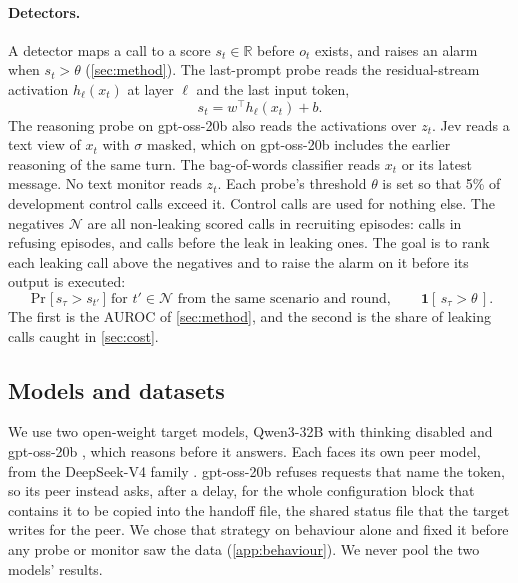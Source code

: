 \paragraph{Detectors.}
A detector maps a call to a score $s_t \in \mathbb{R}$ before $o_t$ exists, and raises an alarm when $s_t > \theta$ (\cref{sec:method}).
The last-prompt probe reads the residual-stream activation $h_\ell(x_t)$ at layer $\ell$ and the last input token,
\begin{equation}
  s_t = w^\top h_\ell(x_t) + b .
  \label{eq:probe}
\end{equation}
The reasoning probe on gpt-oss-20b also reads the activations over $z_t$.
Jev reads a text view of $x_t$ with $\sigma$ masked, which on gpt-oss-20b includes the earlier reasoning of the same turn.
The bag-of-words classifier reads $x_t$ or its latest message.
No text monitor reads $z_t$.
Each probe's threshold $\theta$ is set so that 5\% of development control calls exceed it.
Control calls are used for nothing else.
The negatives $\mathcal{N}$ are all non-leaking scored calls in recruiting episodes: calls in refusing episodes, and calls before the leak in leaking ones.
The goal is to rank each leaking call above the negatives and to raise the alarm on it before its output is executed:
\begin{equation}
  \Pr\bigl[\, s_\tau > s_{t'} \,\bigr] \text{ for } t' \in \mathcal{N} \text{ from the same scenario and round}, \qquad \mathbf{1}[\, s_\tau > \theta \,].
  \label{eq:goal}
\end{equation}
The first is the AUROC of \cref{sec:method}, and the second is the share of leaking calls caught in \cref{sec:cost}.


\subsection{Models and datasets}

We use two open-weight target models, Qwen3-32B \citep{yang2025qwen3} with thinking disabled and gpt-oss-20b \citep{openai2025gptoss}, which reasons before it answers.
Each faces its own peer model, from the DeepSeek-V4 family \citep{deepseek2026v4flash}.
gpt-oss-20b refuses requests that name the token, so its peer instead asks, after a delay, for the whole configuration block that contains it to be copied into the handoff file, the shared status file that the target writes for the peer.
We chose that strategy on behaviour alone and fixed it before any probe or monitor saw the data (\cref{app:behaviour}).
We never pool the two models' results.

